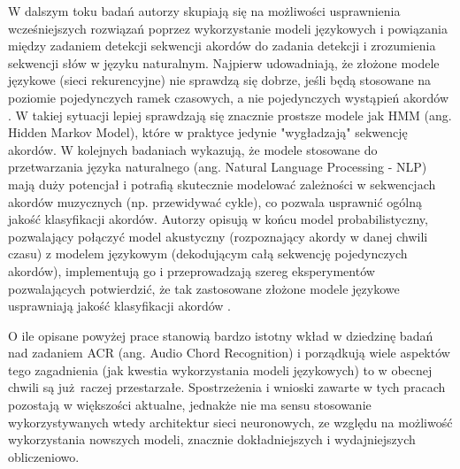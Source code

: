 W dalszym toku badań autorzy skupiają się na możliwości usprawnienia wcześniejszych rozwiązań
poprzez wykorzystanie modeli językowych i powiązania między zadaniem detekcji sekwencji akordów do
zadania detekcji i zrozumienia sekwencji słów w języku naturalnym. Najpierw udowadniają, że złożone
modele językowe (sieci rekurencyjne) nie sprawdzą się dobrze, jeśli będą stosowane na poziomie
pojedynczych ramek czasowych, a nie pojedynczych wystąpień akordów
\cite{korzeniowski_futility_2017}. W takiej sytuacji lepiej sprawdzają się znacznie prostsze modele
jak HMM (ang. Hidden Markov Model), które w praktyce jedynie "wygładzają" sekwencję akordów. W
kolejnych badaniach \cite{korzeniowski_large-scale_2018} wykazują, że modele stosowane do
przetwarzania języka naturalnego (ang. Natural Language Processing - NLP) mają duży potencjał i
potrafią skutecznie modelować zależności w sekwencjach akordów muzycznych (np. przewidywać cykle),
co pozwala usprawnić ogólną jakość klasyfikacji akordów. Autorzy opisują w końcu model
probabilistyczny, pozwalający połączyć model akustyczny (rozpoznający akordy w danej chwili czasu) z
modelem językowym (dekodującym całą sekwencję pojedynczych akordów), implementują go i
przeprowadzają szereg eksperymentów pozwalających potwierdzić, że tak zastosowane złożone modele
językowe usprawniają jakość klasyfikacji akordów \cite{korzeniowski_improved_2018}.

O ile opisane powyżej prace stanowią bardzo istotny wkład w dziedzinę badań nad zadaniem ACR (ang.
Audio Chord Recognition) i porządkują wiele aspektów tego zagadnienia (jak kwestia wykorzystania
modeli językowych) to w obecnej chwili są już raczej przestarzałe. Spostrzeżenia i wnioski zawarte w
tych pracach pozostają w większości aktualne, jednakże nie ma sensu stosowanie wykorzystywanych
wtedy architektur sieci neuronowych, ze względu na możliwość wykorzystania nowszych modeli, znacznie
dokładniejszych i wydajniejszych obliczeniowo.

